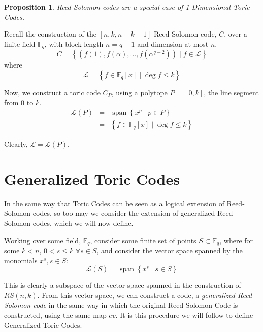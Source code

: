 \documentclass[12pt]{amsart}
\newenvironment{pf}{\proof[\proofname]}{\endproof}
\theoremstyle{plain}
\newtheorem{Proposition}[Th]{Proposition}
\newcommand{\F}{\mathbb{F}}
\DeclareMathOperator{\Span}{span}
\begin{document}
\begin{Proposition}
Reed-Solomon codes are a special case of 1-Dimensional Toric Codes.
\end{Proposition}
\begin{pf}
Recall the construction of the $\left[n,k,n-k+1\right]$ Reed-Solomon code, $C$, over a finite field $\F_q$, with block length $n=q-1$ and dimension at most $n$.
\begin{equation*}
C = \left\{ \left(f(1),f(\alpha),...,f(\alpha^{q-2})\right) \mid f \in \mathscr{L} \right\}
\end{equation*}
where
\begin{equation*}
\mathscr{L} = \left\{f \in \F_q[x] \mid \deg f \le k\right\}
\end{equation*}

Now, we construct a toric code $C_P$, using a polytope $P=\left[0,k\right]$, the line segment from 0 to $k$.
\begin{eqnarray*}
\mathscr{L}(P) & = & \Span \left\{ x^p \mid p \in P \right\} \\
& = & \left\{f \in \F_q[x] \mid \deg f \le k\right\}
\end{eqnarray*}

Clearly, $\mathscr{L} = \mathscr{L}(P)$.

\end{pf}

\section{Generalized Toric Codes}
In the same way that Toric Codes can be seen as a logical extension of Reed-Solomon codes, so too may we consider the extension of generalized Reed-Solomon codes, which we will now define.

Working over some field, $\F_q$, consider some finite set of points $S \subset \F_q$, where for some $k<n$, $0<s\le k$ $\forall s \in S$, and consider the vector space spanned by the monomials $x^s, s \in S$:
\begin{equation*}
\mathscr{L}(S) = \Span\left\{x^s \mid s \in S\right\}
\end{equation*}

This is clearly a subspace of the vector space spanned in the construction of $RS(n,k)$. From this vector space, we can construct a code, a \emph{generalized Reed-Solomon code} in the same way in which the original Reed-Solomon Code is constructed, using the same map $ev$. It is this procedure we will follow to define Generalized Toric Codes.
\end{document}
